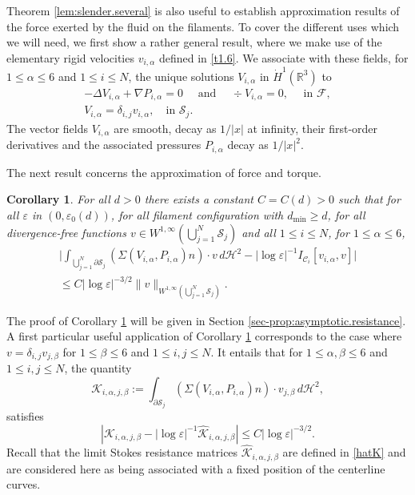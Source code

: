 \documentclass[11pt]{article}
\let\oldbigcup\bigcup
\newcommand{\R}{\mathbb{R}}
\let\eps\varepsilon
\newcommand{\dmin}{d_{\min}}
\newtheorem{cor}[thm]{Corollary}
\theoremstyle{definition}
\theoremstyle{remark}
\begin{document}
Theorem \ref{lem:slender.several} is also useful to establish
approximation results of the force {exerted by the fluid on the filaments.}
To cover the different uses which we will need, we first show a rather general result, where we make use of the elementary rigid velocities $v_{i,\alpha}$ defined in \eqref{t1.6}. We associate with these fields, for $1 \leq \alpha\leq 6$ and $1 \leq i \leq N$, the unique solutions $ V_{i,\alpha}$ in $\dot H^1(\R^3)$ to
\begin{subequations}
\label{sti}
\begin{gather}
\label{sti1}
-\Delta V_{i,\alpha} + \nabla P_{i,\alpha} = 0 \quad \text{ and } \quad \div V_{i,\alpha} = 0, \quad \text{ in } \mathcal F,
\\ \label{sti3}
V_{i,\alpha} = \delta_{i,j} v_{i,\alpha}, \quad \text{in } \mathcal S_j.
\end{gather}
\end{subequations}
The vector fields $ V_{i,\alpha} $ are smooth, decay as $1/ \vert x \vert$ at infinity, their first-order derivatives and the associated pressures $P_{i,\alpha}$ decay as $1/ \vert x \vert^2$.

The next result concerns the approximation of force and torque.
\begin{cor} \label{prop:asymptotic.resistance}
For all $d > 0$ there exists a constant $C = C(d) > 0$ such that for all $\eps $ in $(0, \eps_0(d))$, for all filament configuration with $\dmin \geq d$, for all divergence-free functions $v \in W^{1,\infty}(\bigcup_{j=1}^N \mathcal S_j)$ and all $1 \leq i \leq N$, for $1 \leqslant \alpha \leqslant 6 $,
\begin{multline}
\biggl| \int_{\oldbigcup_{j=1}^N \partial \mathcal S_j} (\Sigma (V_{i,\alpha}, P_{i,\alpha}) n) \cdot v \, d\mathcal{H}^2 - \left|\log \eps\right|^{-1}
I_{\mathcal{C}_i } [v_{i,\alpha}, v]
\biggr| \\
\leq C \left|\log \eps\right|^{- 3/2} \|v\|_{W^{1,\infty}{(\oldbigcup_{j=1}^N \mathcal S_j)}}.
\label{eq:Faxen.force}
\end{multline}
\end{cor}
The proof of Corollary \ref{prop:asymptotic.resistance} will be given in Section \ref{sec-prop:asymptotic.resistance}.
A first particular useful application of Corollary \ref{prop:asymptotic.resistance} corresponds to the case where $v=\delta_{i,j}v_{j,\beta}$ for $1 \leq \beta \leq 6$ and $1 \leq i,j \leq N$. It entails that for $1 \leq \alpha,\beta \leq 6$ and $1 \leq i,j \leq N$, the quantity
\begin{equation} \label{resis}
\mathcal K_{i,\alpha,j,\beta} := \int_{\partial \mathcal S_j} (\Sigma (V_{i,\alpha}, P_{i,\alpha}) n) \cdot v_{j,\beta} \, d\mathcal{H}^2,
\end{equation}
satisfies
\begin{equation}
\left| \mathcal K_{i,\alpha,j,\beta} -
\left|\log \eps\right|^{-1} \hat{\mathcal K}_{i,\alpha,j,\beta}
\right| \leq C \left|\log \eps\right|^{-3/2}. \label{eq:approx.K}
\end{equation}
Recall that the limit Stokes resistance matrices $ \hat{\mathcal K}_{i,\alpha,j,\beta}$ are defined in \eqref{hatK} and are considered here as being associated with a fixed position of the centerline curves.
\end{document}
